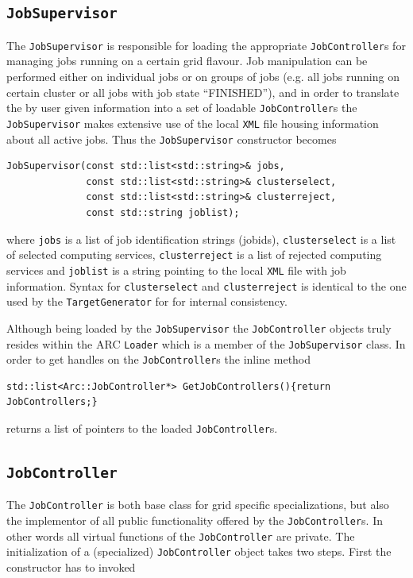 \documentclass{book}
\newcommand{\TargetGenerator}{\texttt{TargetGenerator}}
\newcommand{\JobSupervisor}{\texttt{JobSupervisor}}
\newcommand{\JobController}{\texttt{JobController}}
\newcommand{\XML}{\texttt{XML}}
\newcommand{\Loader}{\texttt{Loader}}
\begin{document}
\subsection{{\JobSupervisor}} The {\JobSupervisor} is responsible for loading the appropriate {\JobController}s for managing 
jobs running on a certain grid flavour. Job manipulation can be performed either on individual jobs or on groups of jobs (e.g. 
all jobs running on certain cluster or all jobs with job state ``FINISHED''), and in order to translate the by user given 
information into a set of loadable {\JobController}s the {\JobSupervisor} makes extensive use of the local {\XML} file housing 
information about all active jobs. Thus the {\JobSupervisor} constructor becomes

\begin{shaded}
\begin{verbatim}
JobSupervisor(const std::list<std::string>& jobs,
              const std::list<std::string>& clusterselect,
              const std::list<std::string>& clusterreject,
              const std::string joblist);
\end{verbatim}
\end{shaded}

where \texttt{jobs} is a list of job identification strings (jobids), \texttt{clusterselect} is a list of selected computing services, 
\texttt{clusterreject} is a list of rejected computing services and \texttt{joblist} is a string pointing to the local {\XML} file 
with job information. Syntax for \texttt{clusterselect} and \texttt{clusterreject} is identical to the one used by the {\TargetGenerator}
for for internal consistency.

Although being loaded by the {\JobSupervisor} the {\JobController} objects truly resides within the ARC {\Loader} which is a member 
of the {\JobSupervisor} class. In order to get handles on the {\JobController}s the inline method

\begin{shaded}
\begin{verbatim}
std::list<Arc::JobController*> GetJobControllers(){return JobControllers;}
\end{verbatim}
\end{shaded}

returns a list of pointers to the loaded {\JobController}s.

\subsection{{\JobController}} The {\JobController} is both base class for grid specific specializations, but also the implementor of all 
public functionality offered by the {\JobController}s. In other words all virtual functions of the {\JobController} are private. The 
initialization of a (specialized) {\JobController} object takes two steps. First the constructor has to invoked
\end{document}

